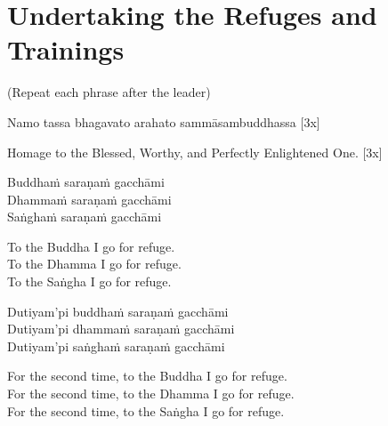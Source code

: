 \section{Undertaking the Refuges and Trainings}

\vspace{1em}

\begin{center}
  \textbf{}\makeatletter\hyperlink{endnote138-appendix}\makeatother
\end{center}

\begin{center}
  (Repeat each phrase after the leader)
\end{center}

Namo tassa bhagavato arahato sammāsambuddhassa \hfill{[3x]}

\begin{english}
  Homage to the Blessed, Worthy, and Perfectly Enlightened One. \hfill{[3x]}
\end{english}

Buddhaṁ saraṇaṁ gacchāmi\\
Dhammaṁ saraṇaṁ gacchāmi\\
Saṅghaṁ saraṇaṁ gacchāmi

\begin{english-verses}
  To the Buddha I go for refuge.\\
  To the Dhamma I go for refuge.\\
  To the Saṅgha I go for refuge.
\end{english-verses}

Dutiyam'pi buddhaṁ saraṇaṁ gacchāmi\\
Dutiyam'pi dhammaṁ saraṇaṁ gacchāmi\\
Dutiyam'pi saṅghaṁ saraṇaṁ gacchāmi

\begin{english-verses}
  For the second time, to the Buddha I go for refuge.\\
  For the second time, to the Dhamma I go for refuge.\\
  For the second time, to the Saṅgha I go for refuge.
\end{english-verses}


